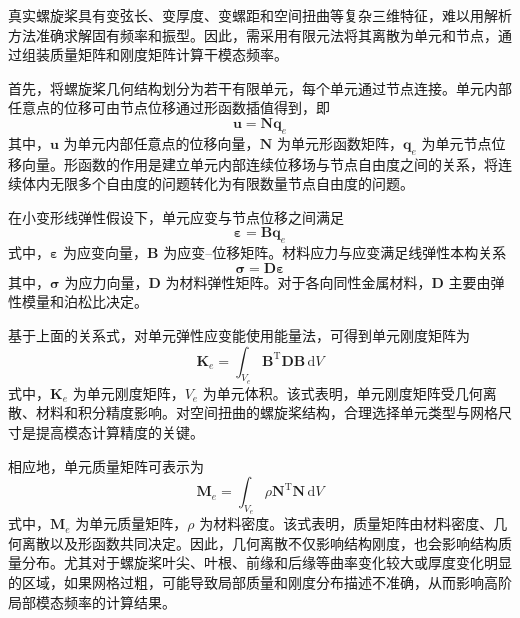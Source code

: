 真实螺旋桨具有变弦长、变厚度、变螺距和空间扭曲等复杂三维特征，难以用解析方法准确求解固有频率和振型。因此，需采用有限元法将其离散为单元和节点，通过组装质量矩阵和刚度矩阵计算干模态频率\cite{chap2:6}。

首先，将螺旋桨几何结构划分为若干有限单元，每个单元通过节点连接。单元内部任意点的位移可由节点位移通过形函数插值得到，即
\begin{equation}
  \mathbf{u}=\mathbf{N}\mathbf{q}_e
\end{equation}
其中，$\mathbf{u}$ 为单元内部任意点的位移向量，$\mathbf{N}$ 为单元形函数矩阵，$\mathbf{q}_e$ 为单元节点位移向量。形函数的作用是建立单元内部连续位移场与节点自由度之间的关系，将连续体内无限多个自由度的问题转化为有限数量节点自由度的问题。

在小变形线弹性假设下，单元应变与节点位移之间满足
\begin{equation}
  \boldsymbol{\varepsilon}=\mathbf{B}\mathbf{q}_e
\end{equation}
式中，$\boldsymbol{\varepsilon}$ 为应变向量，$\mathbf{B}$ 为应变--位移矩阵。材料应力与应变满足线弹性本构关系
\begin{equation}
  \boldsymbol{\sigma}=\mathbf{D}\boldsymbol{\varepsilon}
\end{equation}
其中，$\boldsymbol{\sigma}$ 为应力向量，$\mathbf{D}$ 为材料弹性矩阵。对于各向同性金属材料，$\mathbf{D}$ 主要由弹性模量和泊松比决定。

基于上面的关系式，对单元弹性应变能使用能量法，可得到单元刚度矩阵为
\begin{equation}
  \mathbf{K}_e=\int_{V_e}\mathbf{B}^{\mathrm T}\mathbf{D}\mathbf{B}\,\mathrm{d}V
\end{equation}
式中，$\mathbf{K}_e$ 为单元刚度矩阵，$V_e$ 为单元体积。该式表明，单元刚度矩阵受几何离散、材料和积分精度影响。对空间扭曲的螺旋桨结构，合理选择单元类型与网格尺寸是提高模态计算精度的关键。

相应地，单元质量矩阵可表示为
\begin{equation}
  \mathbf{M}_e=\int_{V_e}\rho \mathbf{N}^{\mathrm T}\mathbf{N}\,\mathrm{d}V
\end{equation}
式中，$\mathbf{M}_e$ 为单元质量矩阵，$\rho$ 为材料密度。该式表明，质量矩阵由材料密度、几何离散以及形函数共同决定。因此，几何离散不仅影响结构刚度，也会影响结构质量分布。尤其对于螺旋桨叶尖、叶根、前缘和后缘等曲率变化较大或厚度变化明显的区域，如果网格过粗，可能导致局部质量和刚度分布描述不准确，从而影响高阶局部模态频率的计算结果。


